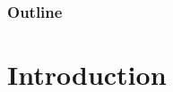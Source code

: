 \newcommand{\ensuretext}[1]{\ensuremath{\text{#1}}}
\def\ie{\ensuretext{\textit{i.e.,\xspace}}}
\def\eg{\ensuretext{\textit{e.g.,\xspace}}}

\newcommand{\uder}[2]{\frac{\partial #1}{\partial #2}}
\newcommand{\C}{\ensuremath{\mathbb{C}}}
\newcommand{\CP}{\ensuremath{\mathbb{CP}}}
\newcommand{\GL}[1]{\ensuremath{\mathrm{GL}(#1)}}
\newcommand{\SL}[1]{\ensuremath{\mathrm{SL}(#1)}}
\newcommand{\Q}{\ensuremath{\mathbb{Q}}}
\newcommand{\R}{\ensuremath{\mathbb{R}}}
\newcommand{\RP}{\ensuremath{\mathbb{RP}}}
\newcommand{\Z}{\ensuremath{\mathbb{Z}}}
\newcommand{\med}{\ensuremath{\mathop{\mathrm{med}}}}
\newcommand{\uPr}{\ensuremath{\mathop{\mathrm{Pr}}}}
\newcommand{\uE}{\ensuremath{\mathrm{E}}}
\newcommand{\ucov}[2]{\ensuremath{\mathop{\mathrm{cov}}\left(#1 ,\, #2\right)}}
\newcommand{\ucor}[2]{\ensuremath{\mathop{\mathrm{corr}}\left(#1 ,\, #2\right)}}
\newcommand{\ucorr}[2]{\ensuremath{\mathop{\mathrm{corr}}\left(#1 ,\, #2\right)}}
\newcommand{\uvar}{\ensuremath{\mathop{\mathrm{var}}}}
\newcommand{\ud}{\ensuremath{\mathrm{d}}}
\newcommand{\uProj}{\ensuremath{\mathop{\mathrm{Proj}}}}
\newcommand{\uimply}{\ensuremath{\;\Longrightarrow\;}}
\newcommand{\uequiv}{\ensuremath{\;\Longleftrightarrow\;}}
\newcommand{\uforall}{\textrm{ for all }}
\newcommand{\us}[1]{\ensuremath{\mathrm{Sym}(#1)}}
\newcommand{\uo}[2]{\mathrm{Orb}_{#1}(#2)}
\newcommand{\ustab}[1]{\mathrm{Stab}(#1)}
\newcommand{\uinner}[2]{\ensuremath{\langle #1 ,\; #2 \rangle}}
\newcommand{\urepeat}[2]{%
  \setcounter{myN}{0}
  \whiledo{\value{myN} < #1}{%
    \stepcounter{myN}#2}}
\newcommand{\uvec}[2][n]{\ensuremath{#2_1, \cdots, #2_{#1}}}
\newcommand{\umark}[1]{\marginpar{%
    \vskip-\baselineskip %
    \raggedright\footnotesize
    \itshape\hrule\smallskip#1\par\smallskip\hrule}}



\begin{frame}
  \titlepage
\end{frame}

\begin{frame}
  \frametitle{Outline}
  \tableofcontents
\end{frame}


\section{Introduction}


